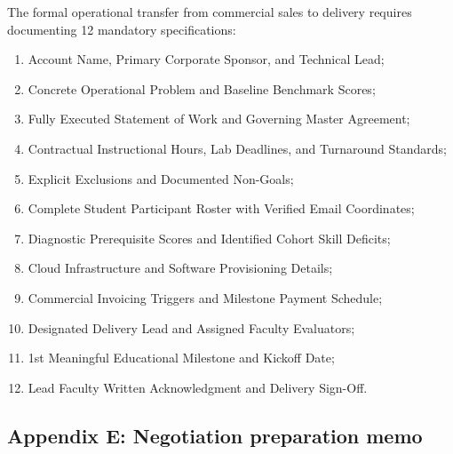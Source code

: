 The formal operational transfer from commercial sales to delivery requires documenting 12 mandatory specifications:
\begin{enumerate}
\item Account Name, Primary Corporate Sponsor, and Technical Lead;
\item Concrete Operational Problem and Baseline Benchmark Scores;
\item Fully Executed Statement of Work and Governing Master Agreement;
\item Contractual Instructional Hours, Lab Deadlines, and Turnaround Standards;
\item Explicit Exclusions and Documented Non-Goals;
\item Complete Student Participant Roster with Verified Email Coordinates;
\item Diagnostic Prerequisite Scores and Identified Cohort Skill Deficits;
\item Cloud Infrastructure and Software Provisioning Details;
\item Commercial Invoicing Triggers and Milestone Payment Schedule;
\item Designated Delivery Lead and Assigned Faculty Evaluators;
\item 1st Meaningful Educational Milestone and Kickoff Date;
\item Lead Faculty Written Acknowledgment and Delivery Sign-Off.
\end{enumerate}

\subsection*{Appendix E: Negotiation preparation memo}

